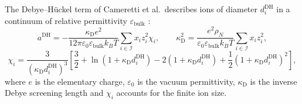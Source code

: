 \documentclass[a4paper,11pt]{article}
\begin{document}
The Debye--H\"uckel term of Cameretti et al.\ describes ions of diameter $d_i^{\mathrm{DH}}$ in a continuum of relative permittivity $\varepsilon_{\mathrm{bulk}}$ \cite{Cameretti2005}:
\begin{equation}
    a^{\mathrm{DH}}=-\frac{\kappa_{\mathrm D}e^2}{12\pi\varepsilon_0\varepsilon_{\mathrm{bulk}}k_BT}\sum_{i\in\mathcal I}x_iz_i^2\chi_i,
    \qquad
    \kappa_{\mathrm D}^2=\frac{e^2\rho_N}{\varepsilon_0\varepsilon_{\mathrm{bulk}}k_BT}\sum_{i\in\mathcal I}x_iz_i^2,
    \label{eq:debye-huckel}
\end{equation}
\begin{equation}
    \chi_i=\frac{3}{\left(\kappa_{\mathrm D}d_i^{\mathrm{DH}}\right)^3}
    \left[\frac32+\ln\left(1+\kappa_{\mathrm D}d_i^{\mathrm{DH}}\right)
    -2\left(1+\kappa_{\mathrm D}d_i^{\mathrm{DH}}\right)
    +\frac12\left(1+\kappa_{\mathrm D}d_i^{\mathrm{DH}}\right)^2\right],
    \label{eq:debye-huckel-chi}
\end{equation}
where $e$ is the elementary charge, $\varepsilon_0$ is the vacuum permittivity, $\kappa_{\mathrm D}$ is the inverse Debye screening length and $\chi_i$ accounts for the finite ion size.
\end{document}
